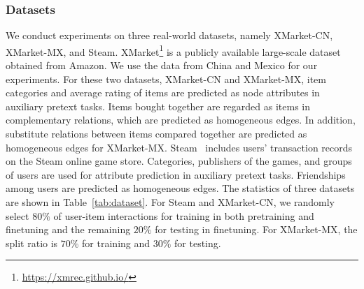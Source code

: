 \subsubsection{Datasets} 
We conduct experiments on three real-world datasets, namely XMarket-CN, XMarket-MX, and Steam.
XMarket\footnote{\url{https://xmrec.github.io/}} is a publicly available large-scale dataset obtained from Amazon. We use the data from China and Mexico for our experiments. For these two datasets, XMarket-CN and XMarket-MX, item categories and average rating of items are predicted as node attributes in auxiliary pretext tasks. Items bought together are regarded as items in complementary relations, which are predicted as homogeneous edges. In addition, substitute relations between items compared together are predicted as homogeneous edges for XMarket-MX.
Steam~\cite{steam} includes users' transaction records on the Steam online game store. Categories, publishers of the games, and groups of users are used for attribute prediction in auxiliary pretext tasks. Friendships among users are predicted as homogeneous edges.
The statistics of three datasets are shown in Table~\ref{tab:dataset}.
For Steam and XMarket-CN, we randomly select $80\%$ of user-item interactions for training in both pretraining and finetuning and the remaining $20\%$ for testing in finetuning. 
For XMarket-MX, the split ratio is $70\%$ for training and $30\%$ for testing. 

\begin{table}
\caption{Statistics of datasets for UPRTH.}\label{tab:dataset}
\end{table}


